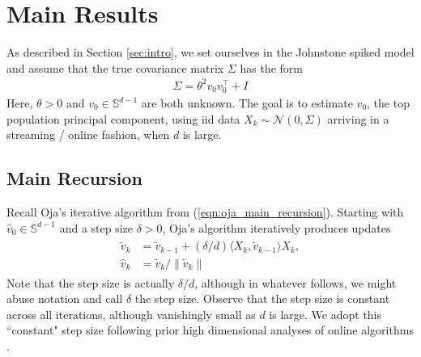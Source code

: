 \documentclass[12pt]{article}
\newcommand{\Unif}{\text{Unif}}
\def\gN{{\mathcal{N}}}
\def\sS{{\mathbb{S}}}
\begin{document}


\section{Main Results}\label{sec:main_results}

As described in Section \ref{sec:intro}, we set ourselves in the Johnstone spiked model \citep{johnstone2001distribution} and assume that the true covariance matrix $\Sigma$ has the form
\begin{align*}
    \Sigma = \theta^2 v_0v_0^\top + I
\end{align*}Here, $\theta>0$ and $v_0\in\sS^{d-1}$ are both unknown. The goal is to estimate $v_0$, the top population principal component, using iid data $X_k\sim\gN(0,\Sigma)$ arriving in a streaming / online fashion, when $d$ is large.

\subsection{Main Recursion}

Recall Oja's iterative algorithm from (\ref{eqn:oja_main_recursion}). Starting with $\hat v_0\in\sS^{d-1}$ and a step size $\delta>0$, Oja's algorithm iteratively produces updates
\begin{align}
\begin{split}
    \tilde v_k &= \tilde v_{k-1} + (\delta/d)\langle X_k,\tilde v_{k-1}\rangle X_k,\\
    \hat v_k &= \tilde v_k/\|\tilde v_k\|    
\end{split}
\end{align}Note that the step size is actually $\delta/d$, although in whatever follows, we might abuse notation and call $\delta$ the step size. Observe that the step size is constant across all iterations, although vanishingly small as $d$ is large. We adopt this ``constant" step size following prior high dimensional analyses of online algorithms \citep{wang2016online,wang2017scaling,arous2021online,ben2022high}.
\end{document}
